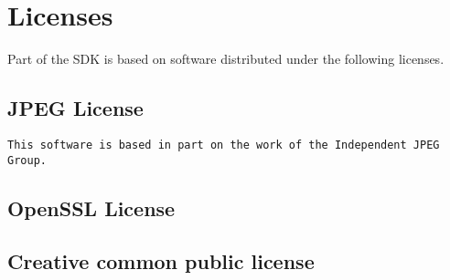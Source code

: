 \chapter{Licenses}

Part of the \urbi SDK is based on software distributed under the
following licenses.


\section{JPEG License}

\begin{lstlisting}[language={},basicstyle={\ttfamily\footnotesize}]
This software is based in part on the work of the Independent JPEG Group.
\end{lstlisting}

\section{OpenSSL License}



\section{Creative common public license}


